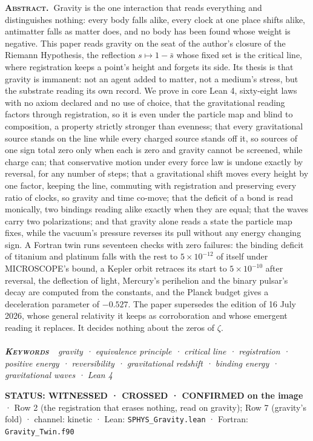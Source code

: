 \documentclass[10pt]{article}
\renewenvironment{quote}{\par\smallskip\noindent\small\color{deep}}{\par\smallskip}
\begin{document}
{\small\noindent\textbf{\scshape\color{deep}Abstract.\ }Gravity is the
one interaction that reads everything and distinguishes nothing: every
body falls alike, every clock at one place shifts alike, antimatter
falls as matter does, and no body has been found whose weight is
negative. This paper reads gravity on the seat of the author's closure
of the Riemann Hypothesis, the reflection \(s\mapsto1-\bar s\) whose
fixed set is the critical line, where registration keeps a point's
height and forgets its side. Its thesis is that gravity is immanent: not
an agent added to matter, not a medium's stress, but the substrate
reading its own record. We prove in core Lean 4, sixty-eight laws with
no axiom declared and no use of choice, that the gravitational reading
factors through registration, so it is even under the particle map and
blind to composition, a property strictly stronger than evenness; that
every gravitational source stands on the line while every charged source
stands off it, so sources of one sign total zero only when each is zero
and gravity cannot be screened, while charge can; that conservative
motion under every force law is undone exactly by reversal, for any
number of steps; that a gravitational shift moves every height by one
factor, keeping the line, commuting with registration and preserving
every ratio of clocks, so gravity and time co-move; that the deficit of
a bond is read monically, two bindings reading alike exactly when they
are equal; that the waves carry two polarizations; and that gravity
alone reads a state the particle map fixes, while the vacuum's pressure
reverses its pull without any energy changing sign. A Fortran twin runs
seventeen checks with zero failures: the binding deficit of titanium and
platinum falls with the rest to \(5\times10^{-12}\) of itself under
MICROSCOPE's bound, a Kepler orbit retraces its start to
\(5\times10^{-10}\) after reversal, the deflection of light, Mercury's
perihelion and the binary pulsar's decay are computed from the
constants, and the Planck budget gives a deceleration parameter of
\(-0.527\). The paper supersedes the edition of 16 July 2026, whose
general relativity it keeps as corroboration and whose emergent reading
it replaces. It decides nothing about the zeros of \(\zeta\).}\\[-2pt]
\noindent{\color{accent}\rule{\textwidth}{0.6pt}}\\[1pt]
{\itshape\footnotesize\color{faint}\noindent\textbf{\upshape\scshape\color{deep}Keywords\ }\ gravity
· equivalence principle · critical line · registration · positive energy
· reversibility · gravitational redshift · binding energy ·
gravitational waves · Lean 4}\par\vspace{8pt}
\thispagestyle{fancy}
\begin{quote}
\textbf{STATUS: WITNESSED · CROSSED · CONFIRMED on the image} · Row 2
(the registration that erases nothing, read on gravity); Row 7
(gravity's fold) · channel: kinetic · Lean: \texttt{SPHYS\_Gravity.lean}
· Fortran: \texttt{Gravity\_Twin.f90}
\end{quote}
\end{document}
